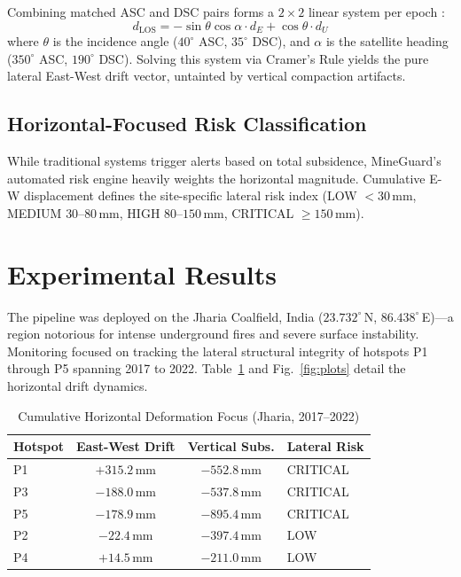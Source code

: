 \documentclass[conference]{IEEEtran}
\begin{document}
Combining matched ASC and DSC pairs forms a $2\times2$ linear system
per epoch \cite{wright2004}:
\begin{equation}
  d_{\mathrm{LOS}} = -\sin\theta\cos\alpha\cdot d_E
                   + \cos\theta\cdot d_U
  \label{eq:obs}
\end{equation}
where $\theta$ is the incidence angle ($40^\circ$ ASC, $35^\circ$
DSC), and $\alpha$ is the satellite heading ($350^\circ$ ASC,
$190^\circ$ DSC). Solving this system via Cramer's Rule yields
the pure lateral East-West drift vector, untainted by vertical
compaction artifacts.

\subsection{Horizontal-Focused Risk Classification}
While traditional systems trigger alerts based on total subsidence,
MineGuard's automated risk engine heavily weights the horizontal
magnitude. Cumulative E-W displacement defines the site-specific
lateral risk index (LOW $<30$\,mm, MEDIUM $30$--$80$\,mm, HIGH
$80$--$150$\,mm, CRITICAL $\geq150$\,mm).

\section{Experimental Results}

The pipeline was deployed on the Jharia Coalfield, India
($23.732^\circ$\,N, $86.438^\circ$\,E)—a region notorious for intense
underground fires and severe surface instability. Monitoring focused
on tracking the lateral structural integrity of hotspots P1 through
P5 spanning 2017 to 2022. Table~\ref{tab:results} and Fig.~\ref{fig:plots}
detail the horizontal drift dynamics.

\begin{table}[h]
  \caption{Cumulative Horizontal Deformation Focus (Jharia, 2017–2022)}
  \label{tab:results}
  \centering
  \setlength{\tabcolsep}{6pt}
  \begin{tabular}{lccl}
    \toprule
    \textbf{Hotspot} & \textbf{East-West Drift} & \textbf{Vertical Subs.} & \textbf{Lateral Risk} \\
    \midrule
    P1 & $+315.2$\,mm & $-552.8$\,mm & CRITICAL \\
    P3 & $-188.0$\,mm & $-537.8$\,mm & CRITICAL \\
    P5 & $-178.9$\,mm & $-895.4$\,mm & CRITICAL \\
    P2 & $-22.4$\,mm  & $-397.4$\,mm & LOW \\
    P4 & $+14.5$\,mm  & $-211.0$\,mm & LOW \\
    \bottomrule
  \end{tabular}
\end{table}
\end{document}
